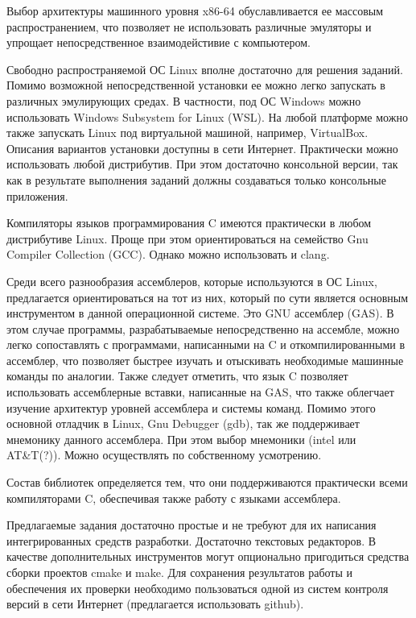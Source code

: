 Выбор архитектуры машинного уровня x86-64 обуславливается ее массовым распространением, что позволяет не использовать различные эмуляторы и упрощает непосредственное взаимодейстивие с компьютером.

Свободно распространяемой ОС Linux вполне достаточно для решения заданий. Помимо возможной непосредственной установки ее можно легко запускать в различных эмулирующих средах. В частности, под ОС Windows можно использовать Windows Subsystem for Linux (WSL). На любой платформе можно также запускать Linux под виртуальной машиной, например, VirtualBox. Описания вариантов установки доступны в сети Интернет. Практически можно использовать любой дистрибутив. При этом достаточно консольной версии, так как в результате выполнения заданий должны создаваться только консольные приложения.

Компиляторы языков программирования C имеются практически в любом дистрибутиве Linux. Проще при этом ориентироваться на семейство Gnu Compiler Collection (GCC). Однако можно использовать и clang.

Среди всего разнообразия ассемблеров, которые используются в ОС Linux, предлагается ориентироваться на тот из них, который по сути является основным инструментом в данной операционной системе. Это GNU ассемблер (GAS). В этом случае программы, разрабатываемые непосредственно на ассембле, можно легко сопоставлять с программами, написанными на C и откомпилированными в ассемблер, что позволяет быстрее изучать и отыскивать необходимые машинные команды по аналогии. Также следует отметить, что язык C позволяет использовать ассемблерные вставки, написанные на GAS, что также облегчает изучение архитектур уровней ассемблера и системы команд. Помимо этого основной отладчик в Linux, Gnu Debugger (gdb), так же поддерживает мнемонику данного ассемблера. При этом выбор мнемоники (intel или AT\&T(?)). Можно осуществлять по собственному усмотрению.

Состав библиотек определяется тем, что они поддерживаются практически всеми компиляторами C, обеспечивая также работу с языками ассемблера.

Предлагаемые задания достаточно простые и не требуют для их написания интегрированных средств разработки. Достаточно текстовых редакторов. В качестве дополнительных инструментов могут опционально пригодиться средства сборки проектов cmake и make. Для сохранения результатов работы и обеспечения их проверки необходимо пользоваться одной из систем контроля версий в сети Интернет (предлагается использовать github).

